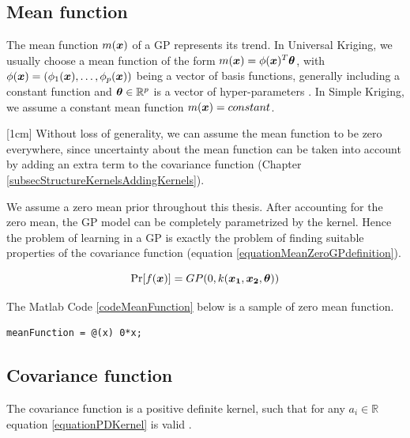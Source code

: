 \subsection{Mean function}\label{subSecCH2MeanFunction}
The mean function $m(\boldsymbol{x})$ of a GP represents its trend. In Universal Kriging, we usually choose a mean function of the form $m(\boldsymbol{x}) = \phi(\boldsymbol{x})^{T}\boldsymbol{\theta}$, with $\phi(\boldsymbol{x}) = (\phi_{1}(\boldsymbol{x}), \ldots , \phi_{p}(\boldsymbol{x}))$ being a vector of basis functions, generally including a constant function and $\boldsymbol{\theta} \in \mathbb{R}^{p}$ is a vector of hyper-parameters \cite{matheron1963principles}. In Simple Kriging, we assume a constant mean function $m(\boldsymbol{x}) = constant$.

[1cm]
Without loss of generality, we can assume the mean function to be zero everywhere, since uncertainty about the mean function can be taken into account by adding an extra term to the covariance function (Chapter \ref{subsecStructureKernelsAddingKernels}).  

We assume a zero mean prior throughout this thesis. After accounting for the zero mean, the GP model can be completely parametrized by the kernel. Hence the problem of learning in a GP is exactly the problem of finding suitable properties of the covariance function \cite{Rasmussen2005} (equation \ref{equationMeanZeroGPdefinition}). 


\begin{equation}\label{equationMeanZeroGPdefinition}
\Pr[f(\boldsymbol{x})] = GP(0 , k(\boldsymbol{x_1}, \boldsymbol{x_2}, \boldsymbol{\theta}))
\end{equation}

The Matlab Code \ref{codeMeanFunction} below is a sample of zero mean function. 

\begin{mdframed}[hidealllines=true,backgroundcolor=lightgray!20]
\begin{lstlisting}[caption={A zero mean function}, 
                    captionpos=b, 
                    label={codeMeanFunction},
                    style=Matlab-editor, 
                    basicstyle=\color{black}\ttfamily\small,
                    backgroundcolor = \color{MatlabCellColour},
                   ]
% zero mean function
meanFunction = @(x) 0*x; 

\end{lstlisting}
\end{mdframed}

\subsection{Covariance function}\label{subSecCH2Covariance}
The covariance function is a positive definite kernel, such that for any $a_{i} \in \mathbb{R}$ equation \ref{equationPDKernel} is valid \cite{Stein1999Springer}.


